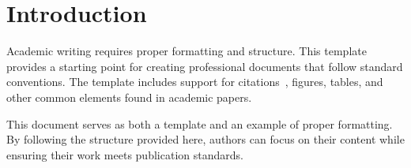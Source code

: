 \section{Introduction}
\label{s:intro}

Academic writing requires proper formatting and structure. This template 
provides a starting point for creating professional documents that follow 
standard conventions. The template includes support for citations~\cite{latex}, 
figures, tables, and other common elements found in academic papers.

This document serves as both a template and an example of proper formatting. 
By following the structure provided here, authors can focus on their content 
while ensuring their work meets publication standards.